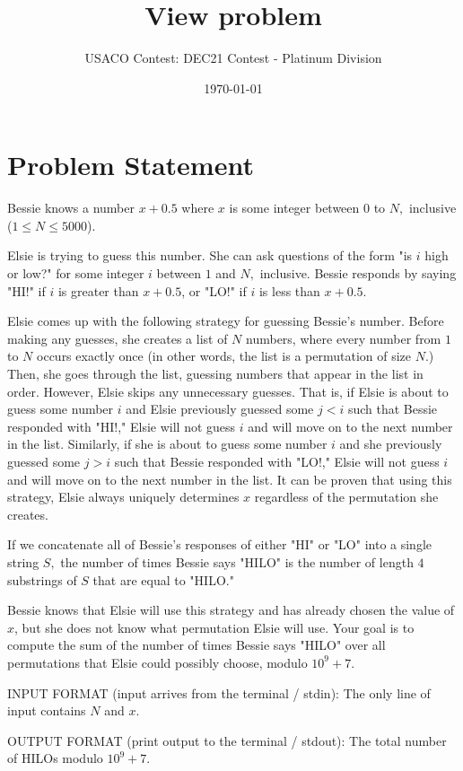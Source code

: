 \documentclass[12pt]{article}
\title{View problem}
\author{USACO Contest: DEC21 Contest - Platinum Division}
\date{\today}
\begin{document}
\maketitle

\section*{Problem Statement}

Bessie knows a number $x+0.5$ where $x$ is some integer between $0$ to $N,$
inclusive ($1\le N\le 5000$).  

Elsie is trying to guess this number. She can ask questions of the form  "is $i$
high or low?" for some integer $i$ between $1$ and $N,$ inclusive.  Bessie
responds by saying "HI!" if $i$ is greater than $x+0.5$, or "LO!" if $i$ is less
than $x+0.5$.

Elsie comes up with the following strategy for guessing Bessie's number. Before
making any guesses, she creates a list of $N$ numbers, where every number from
$1$ to $N$ occurs exactly once (in other words, the list is a permutation of
size $N$.) Then, she goes through the list, guessing numbers that appear in the
list in order. However, Elsie skips any unnecessary guesses. That is, if Elsie
is about to guess some number $i$ and Elsie previously guessed some $j < i$ such
that Bessie responded with "HI!," Elsie will not guess $i$ and will move on to
the next number in the list. Similarly, if she is about to guess some number $i$
and she previously guessed some $j > i$ such that Bessie responded with "LO!,"
Elsie will not guess $i$ and will move on to the next number in the list. It can
be proven that using this strategy, Elsie always uniquely determines $x$
regardless of the permutation she creates. 

If we concatenate all of Bessie's responses of either "HI" or "LO" into a single
string $S,$ the number of times Bessie says "HILO" is the number of length $4$
substrings of $S$ that are equal to "HILO."

Bessie knows that Elsie will use this strategy and has already chosen the value
of $x$, but she does not know what permutation Elsie will use. Your goal is to
compute the sum of the number of times Bessie says "HILO" over all permutations
that Elsie could possibly choose, modulo $10^9+7$.

INPUT FORMAT (input arrives from the terminal / stdin):
The only line of input contains $N$ and $x$.

OUTPUT FORMAT (print output to the terminal / stdout):
The total number of HILOs modulo $10^9+7$.
\end{document}
